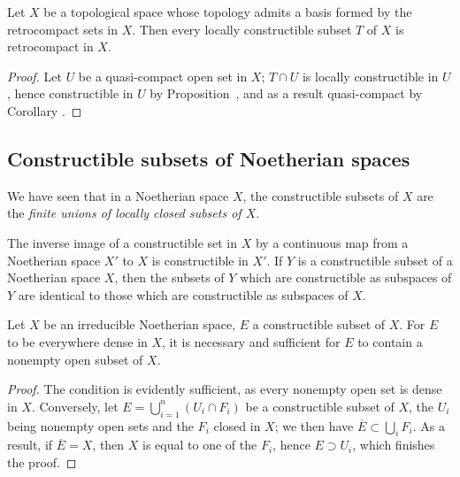 \begin{corollary}[9.1.13]
\label{0.9.1.13}
Let $X$ be a topological space whose topology admits a basis formed by the retrocompact sets in $X$.
Then every locally constructible subset $T$ of $X$ is retrocompact in $X$.
\end{corollary}

\begin{proof}
Let $U$ be a quasi-compact open set in $X$; $T\cap U$ is locally constructible in $U$, hence constructible in $U$ by Proposition~, and as a result quasi-compact by Corollary .
\end{proof}

\subsection{Constructible subsets of Noetherian spaces}
\label{subsection:0.9.2}

\begin{env}[9.2.1]
\label{0.9.2.1}
We have seen  that in a Noetherian space $X$, the constructible subsets of $X$ are the \emph{finite unions of locally closed subsets of $X$}.

The inverse image of a constructible set in $X$ by a continuous map from a Noetherian space $X'$ to $X$ is constructible in $X'$.
If $Y$ is a constructible subset of a Noetherian space $X$, then the subsets of $Y$ which are constructible as subspaces of $Y$ are identical to those which are constructible as subspaces of $X$.
\end{env}

\begin{proposition}[9.2.2]
\label{0.9.2.2}
Let $X$ be an irreducible Noetherian space, $E$ a constructible subset of $X$.
For $E$ to be everywhere dense in $X$, it is necessary and sufficient for $E$ to contain a nonempty open subset of $X$.
\end{proposition}

\begin{proof}
The condition is evidently sufficient, as every nonempty open set is dense in $X$.
Conversely, let $E=\bigcup_{i=1}^n(U_i\cap F_i)$ be a constructible subset of $X$, the $U_i$ being nonempty open sets and the $F_i$ closed in $X$; we then have $\overline{E}\subset\bigcup_i F_i$.
As a result, if $\overline{E}=X$, then $X$ is equal to one of the $F_i$, hence $E\supset U_i$, which finishes the proof.
\end{proof}

